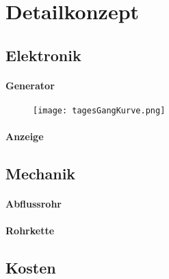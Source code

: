 \section{Detailkonzept} \label{sec:detailkonzept}

\subsection{Elektronik}

\paragraph{Generator}
\begin{figure}[H]
\centering
\texttt{[image: tagesGangKurve.png]}
\label{fig:tagesGangKurve}
\end{figure}
\paragraph{Anzeige}

\subsection{Mechanik}

\paragraph{Abflussrohr}

\paragraph{Rohrkette}


\subsection{Kosten}